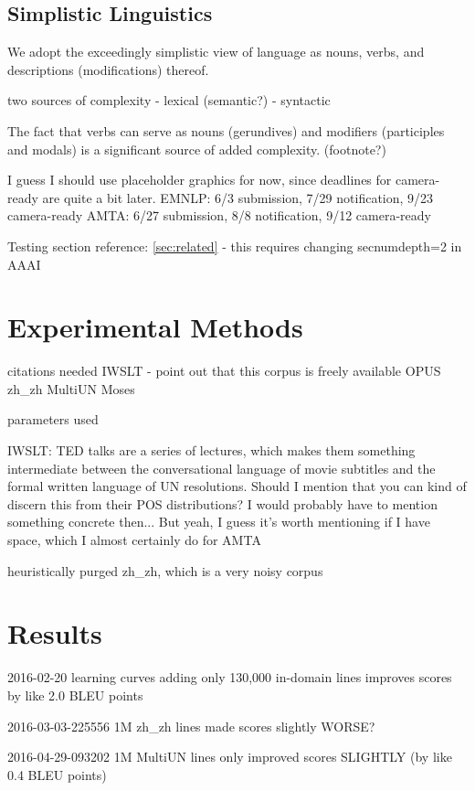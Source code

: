 \subsection{Simplistic Linguistics}
We adopt the exceedingly simplistic view of language as nouns, verbs, and descriptions (modifications) thereof.

two sources of complexity
- lexical (semantic?)
- syntactic 

The fact that verbs can serve as nouns (gerundives) and modifiers (participles and modals) is a significant source of added complexity. (footnote?)


I guess I should use placeholder graphics for now, since deadlines for camera-ready are quite a bit later.
EMNLP: 6/3 submission, 7/29 notification, 9/23 camera-ready
AMTA: 6/27 submission, 8/8 notification, 9/12 camera-ready

Testing section reference: \ref{sec:related} - this requires changing secnumdepth=2 in AAAI

\section{Experimental Methods}

citations needed
IWSLT - point out that this corpus is freely available
OPUS zh\_zh
MultiUN
Moses

parameters used

IWSLT: TED talks are a series of lectures, which makes them something intermediate between the conversational language of movie subtitles and the formal written language of UN resolutions.
Should I mention that you can kind of discern this from their POS distributions? I would probably have to mention something concrete then... But yeah, I guess it's worth mentioning if I have space, which I almost certainly do for AMTA

heuristically purged zh\_zh, which is a very noisy corpus

\section{Results}

2016-02-20 learning curves adding only 130,000 in-domain lines improves scores by like 2.0 BLEU points

2016-03-03-225556 1M zh\_zh lines made scores slightly WORSE?

2016-04-29-093202 1M MultiUN lines only improved scores SLIGHTLY (by like 0.4 BLEU points)

